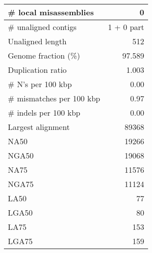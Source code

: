 \documentclass[12pt,a4paper]{article}
\begin{document}
\begin{table}[ht]
\begin{center}
\begin{tabular}{|l*{1}{|r}|}
\# local misassemblies & 0 \\ \hline
\# unaligned contigs & 1 + 0 part \\ \hline
Unaligned length & 512 \\ \hline
Genome fraction (\%) & 97.589 \\ \hline
Duplication ratio & 1.003 \\ \hline
\# N's per 100 kbp & 0.00 \\ \hline
\# mismatches per 100 kbp & 0.97 \\ \hline
\# indels per 100 kbp & 0.00 \\ \hline
Largest alignment & 89368 \\ \hline
NA50 & 19266 \\ \hline
NGA50 & 19068 \\ \hline
NA75 & 11576 \\ \hline
NGA75 & 11124 \\ \hline
LA50 & 77 \\ \hline
LGA50 & 80 \\ \hline
LA75 & 153 \\ \hline
LGA75 & 159 \\ \hline
\end{tabular}
\end{center}
\end{table}
\end{document}
